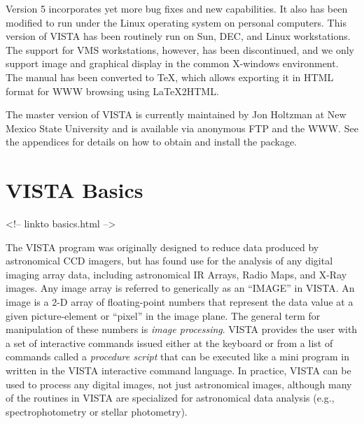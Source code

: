Version 5 incorporates yet more bug fixes and new capabilities. It also has
been modified to run under the Linux operating system on personal
computers. This version of VISTA has been routinely run on Sun, DEC, and
Linux workstations. The support for VMS workstations, however, has been
discontinued, and we only support image and graphical display in the common
X-windows environment.  The manual has been converted to TeX, which allows
exporting it in HTML format for WWW browsing using LaTeX2HTML.

The master version of VISTA is currently maintained by Jon Holtzman at New
Mexico State University and is available via anonymous FTP and the WWW. See
the appendices for details on how to obtain and install the package.

\section{VISTA Basics}
\begin{rawhtml}
<!-- linkto basics.html -->
\end{rawhtml}

The VISTA program was originally designed to reduce data produced by
astronomical CCD imagers, but has found use for the analysis of any digital
imaging array data, including astronomical IR Arrays, Radio Maps, and X-Ray
images.  Any image array is referred to generically as an ``IMAGE'' in
VISTA.  An image is a 2-D array of floating-point numbers that represent
the data value at a given picture-element or ``pixel'' in the image plane.
The general term for manipulation of these numbers is \textit{image
processing}.  VISTA provides the user with a set of interactive commands
issued either at the keyboard or from a list of commands called a
\textit{procedure script} that can be executed like a mini program in
written in the VISTA interactive command language.  In practice, VISTA can
be used to process any digital images, not just astronomical images,
although many of the routines in VISTA are specialized for astronomical
data analysis (e.g., spectrophotometry or stellar photometry).

